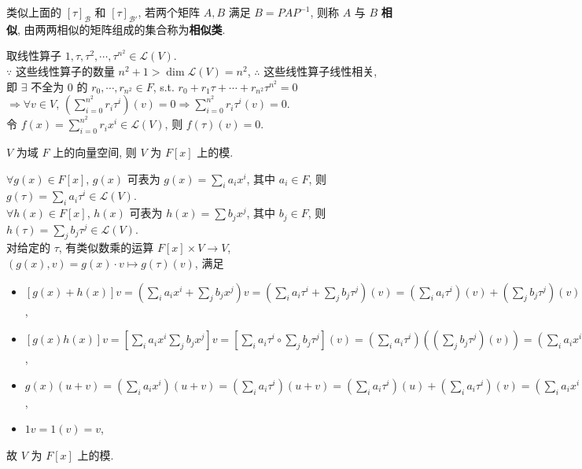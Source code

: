 \documentclass{note}
\begin{document}
\begin{df}[相似]
    类似上面的 $[\tau]_{\mathcal{B}}$ 和 $[\tau]_{\mathcal{B}'}$, 若两个矩阵 $A,B$ 满足 $B=PAP^{-1}$, 则称 $A$ 与 $B$ \textbf{相似}, 由两两相似的矩阵组成的集合称为\textbf{相似类}.
\end{df}

取线性算子 $1,\tau,\tau^2,\cdots,\tau^{n^2}\in\mathcal{L}(V)$.\\
$\because$ 这些线性算子的数量 $n^2+1>\dim\mathcal{L}(V)=n^2$, $\therefore$ 这些线性算子线性相关,\\
即 $\exists$ 不全为 $0$ 的 $r_0,\cdots,r_{n^2}\in F$, s.t. $r_0+r_1\tau+\cdots+r_{n^2}\tau^{n^2}=0$\\
$\Longrightarrow\forall v\in V$, $\left(\sum_{i=0}^{n^2}r_i\tau^i\right)(v)=0\Longrightarrow\sum_{i=0}^{n^2}r_i\tau^i(v)=0$.\\
令 $f(x)=\sum_{i=0}^{n^2}r_ix^i\in\mathcal{L}(V)$, 则 $f(\tau)(v)=0$.

\begin{thm}[(课本定理 7.5)]
    $V$ 为域 $F$ 上的向量空间, 则 $V$ 为 $F[x]$ 上的模.
\end{thm}
\begin{pf}
    $\forall g(x)\in F[x]$, $g(x)$ 可表为 $g(x)=\sum_ia_ix^i$, 其中 $a_i\in F$, 则 $g(\tau)=\sum_ia_i\tau^i\in\mathcal{L}(V)$.\\
    $\forall h(x)\in F[x]$, $h(x)$ 可表为 $h(x)=\sum b_jx^j$, 其中 $b_j\in F$, 则 $h(\tau)=\sum_jb_j\tau^j\in\mathcal{L}(V)$.\\
    对给定的 $\tau$, 有类似数乘的运算 $F[x]\times V\rightarrow V$, $(g(x),v)=g(x)\cdot v\mapsto g(\tau)(v)$, 满足
    \begin{itemize}
        \item[(1)] $[g(x)+h(x)]v=\left(\sum_ia_ix^i+\sum_jb_jx^j\right)v=\left(\sum_ia_i\tau^i+\sum_jb_j\tau^j\right)(v)=\left(\sum_ia_i\tau^i\right)(v)+\left(\sum_jb_j\tau^j\right)(v)=\left(\sum_ia_ix^i\right)v+\left(\sum_jb_jx^j\right)v=g(x)v+h(x)v$,
        \item[(2)] $[g(x)h(x)]v=\left[\sum_ia_ix^i\sum_jb_jx^j\right]v=\left[\sum_ia_i\tau^i\circ\sum_jb_j\tau^j\right](v)=\left(\sum_ia_i\tau^i\right)\left(\left(\sum_jb_j\tau^j\right)(v)\right)=\left(\sum_ia_ix^i\right)\left(\left(\sum_jb_jx^j\right)v\right)=g(x)[h(x)v]$,
        \item[(3)] $g(x)(u+v)=\left(\sum_ia_ix^i\right)(u+v)=\left(\sum_ia_i\tau^i\right)(u+v)=\left(\sum_ia_i\tau^i\right)(u)+\left(\sum_ia_i\tau^i\right)(v)=\left(\sum_ia_ix^i\right)u+\left(\sum_ia_ix^i\right)v=g(x)u+g(x)v$,
        \item[(4)] $1v=1(v)=v$,
    \end{itemize}
    故 $V$ 为 $F[x]$ 上的模.
\end{pf}
\end{document}

